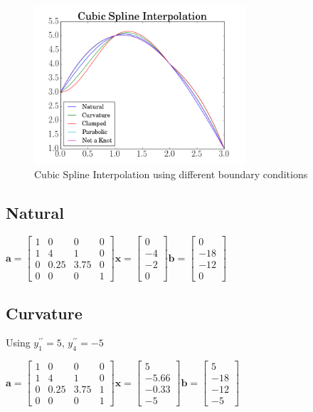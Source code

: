 \documentclass[12pt]{article}
\begin{document}
  \begin{figure}[h!]
    \centering
    \includegraphics[width=0.7\textwidth]{spline.png}
    \caption{Cubic Spline Interpolation using different boundary conditions}
  \end{figure}

  \subsection*{Natural}
  $
    \bm{a} = \left[
  \begin{matrix}
  1 & 0 & 0 & 0 \\
  1 & 4 & 1 & 0 \\
  0 & 0.25  & 3.75 & 0 \\
  0 & 0 & 0 & 1
  \end{matrix}
  \right]
  \bm{x} = \left[
  \begin{matrix}
  0    \\
  -4 \\
  -2 \\
  0
  \end{matrix}
  \right]
  \bm{b} = \left[
  \begin{matrix}
  0   \\
  -18 \\
  -12 \\
  0
  \end{matrix}
  \right]
  $

  \subsection*{Curvature}
  Using $y_1^{\prime\prime}=5$, $y_4^{\prime\prime}=-5$

  $
  \bm{a} = \left[
  \begin{matrix}
  1 & 0 & 0 & 0 \\
  1 & 4 & 1 & 0 \\
  0 & 0.25 & 3.75 & 1 \\
  0 & 0 & 0 & 1
  \end{matrix}
  \right]
  \bm{x} = \left[
  \begin{matrix}
  5     \\
  -5.66 \\
  -0.33 \\
  -5
  \end{matrix}
  \right]
  \bm{b} = \left[
  \begin{matrix}
  5   \\
  -18 \\
  -12 \\
  -5
  \end{matrix}
  \right]
  $
\end{document}
